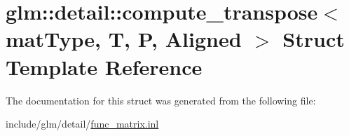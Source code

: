 \hypertarget{structglm_1_1detail_1_1compute__transpose}{}\section{glm\+:\+:detail\+:\+:compute\+\_\+transpose$<$ mat\+Type, T, P, Aligned $>$ Struct Template Reference}
\label{structglm_1_1detail_1_1compute__transpose}


The documentation for this struct was generated from the following file\+:\begin{DoxyCompactItemize}
\item 
include/glm/detail/\hyperlink{func__matrix_8inl}{func\+\_\+matrix.\+inl}\end{DoxyCompactItemize}
